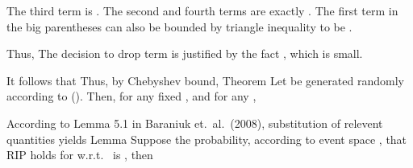 The third term is .
The second and fourth terms are exactly .
The first term in the big parentheses can also be bounded by triangle inequality to be .

Thus,
The decision to drop  term is justified by the fact , which is small.

\stopsubsection

\startsubsection [title={Using Chebyshev Bound}]

It follows that
Thus, by Chebyshev bound,
\Result
{Theorem}
{
Let  be generated randomly according to ().
Then, for any fixed , and for any ,
}

According to Lemma 5.1 in Baraniuk et.\ al.\ (2008), substitution of relevent quantities yields
\Result
{Lemma}
{
Suppose the probability, according to event space , that RIP holds for  w.r.t.\  is , then
}

\stopsubsection
\stopsection



